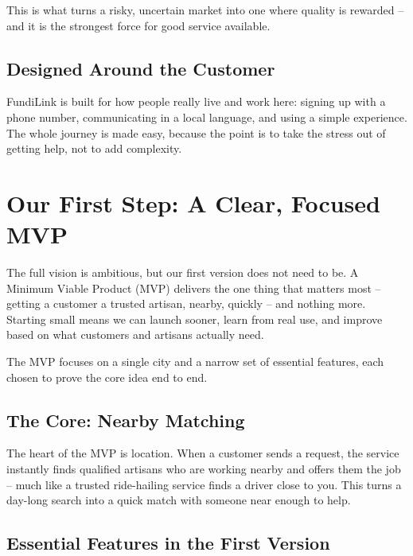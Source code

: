 \documentclass[11pt,a4paper]{article}
\begin{document}
This is what turns a risky, uncertain market into one where quality is rewarded -- and it is
the strongest force for good service available.

\subsection{Designed Around the Customer}

FundiLink is built for how people really live and work here: signing up with a phone number,
communicating in a local language, and using a simple experience. The whole journey is made
easy, because the point is to take the stress out of getting help, not to add complexity.

\section{Our First Step: A Clear, Focused MVP}

The full vision is ambitious, but our first version does not need to be. A Minimum Viable
Product (MVP) delivers the one thing that matters most -- getting a customer a trusted
artisan, nearby, quickly -- and nothing more. Starting small means we can launch sooner, learn
from real use, and improve based on what customers and artisans actually need.

The MVP focuses on a single city and a narrow set of essential features, each chosen to prove
the core idea end to end.

\subsection{The Core: Nearby Matching}

The heart of the MVP is location. When a customer sends a request, the service instantly finds
qualified artisans who are working nearby and offers them the job -- much like a trusted
ride-hailing service finds a driver close to you. This turns a day-long search into a quick
match with someone near enough to help.

\subsection{Essential Features in the First Version}
\end{document}
